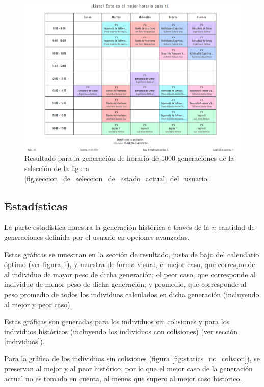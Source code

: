 \begin{figure}[h]
    \centering
    \includegraphics[width=\textwidth]{images/result.png}
    \caption{Resultado para la generación de horario de 1000 generaciones de la selección de la figura \ref{fig:seccion_de_seleccion_de_estado_actual_del_usuario}.}
    \label{fig:resultado}
\end{figure}

\subsection{Estadísticas} \label{estadisticas}
La parte estadística muestra la generación histórica a través de la \(n\) cantidad de generaciones definida por el usuario en opciones avanzadas.

Estas gráficas se muestran en la sección de resultado, justo de bajo del calendario óptimo (ver figura \ref{fig:resultado}), y muestra de forma visual, el mejor caso, que corresponde al individuo de mayor peso de dicha generación; el peor caso, que corresponde al individuo de menor peso de dicha generación; y promedio, que corresponde al peso promedio de todos los individuos calculados en dicha generación (incluyendo al mejor y peor caso).

Estas gráficas son generadas para los individuos sin colisiones y para los individuos históricos (incluyendo los individuos con colisiones) (ver sección \ref{individuos}).

Para la gráfica de los individuos sin colisiones (figura \ref{fig:statics_no_colision}), se preservan al mejor y al peor histórico, por lo que el mejor caso de la generación actual no es tomado en cuenta, al menos que supero al mejor caso histórico.

